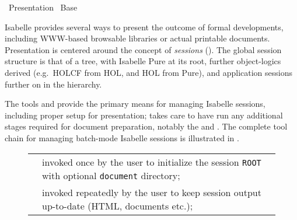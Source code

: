 %
\begin{isabellebody}%
\def\isabellecontext{Presentation}%
%
\isadelimtheory
%
\endisadelimtheory
%
\isatagtheory
{}\isamarkupfalse%
\ Presentation\isanewline
{}\ Base\isanewline
{}%
\endisatagtheory
{\isafoldtheory}%
%
\isadelimtheory
%
\endisadelimtheory
%
\isamarkuptrue%
%
\begin{isamarkuptext}%
Isabelle provides several ways to present the outcome of
  formal developments, including WWW-based browsable libraries or
  actual printable documents.  Presentation is centered around the
  concept of \emph{sessions} ().  The global session
  structure is that of a tree, with Isabelle Pure at its root, further
  object-logics derived (e.g.\ HOLCF from HOL, and HOL from Pure), and
  application sessions further on in the hierarchy.

  The tools \hyperlink{tool.mkroot}{\mbox{}} and \hyperlink{tool.build}{\mbox{}} provide the
  primary means for managing Isabelle sessions, including proper setup
  for presentation; \hyperlink{tool.build}{\mbox{}} takes care to have \hyperlink{executable.isabelle-process}{\mbox{}} run any additional stages required for document
  preparation, notably the \hyperlink{tool.document}{\mbox{}} and \hyperlink{tool.latex}{\mbox{}}.
  The complete tool chain for managing batch-mode Isabelle sessions is
  illustrated in .

  \begin{figure}[htbp]
  \begin{center}
  \begin{tabular}{lp{}}

      \indexref{}{tool}{mkroot}\hyperlink{tool.mkroot}{\mbox{\isa{\isatool{mkroot}}}} & invoked once by the user to initialize the
      session \verb|ROOT| with optional \verb|document|
      directory; \\

      \indexref{}{tool}{build}\hyperlink{tool.build}{\mbox{\isa{\isatool{build}}}} & invoked repeatedly by the user to keep
      session output up-to-date (HTML, documents etc.); \\


\end{tabular}
\end{center}
\end{figure}
\end{isamarkuptext}
\end{isabellebody}
